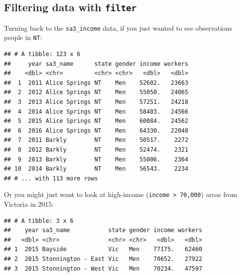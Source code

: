 \documentclass[]{book}
\newenvironment{Shaded}{\begin{snugshade}}{\end{snugshade}}
\newcommand{\DecValTok}[1]{\textcolor[rgb]{0.00,0.00,0.81}{#1}}
\newcommand{\KeywordTok}[1]{\textcolor[rgb]{0.13,0.29,0.53}{\textbf{#1}}}
\newcommand{\NormalTok}[1]{#1}
\newcommand{\OperatorTok}[1]{\textcolor[rgb]{0.81,0.36,0.00}{\textbf{#1}}}
\newcommand{\StringTok}[1]{\textcolor[rgb]{0.31,0.60,0.02}{#1}}
\begin{document}
\hypertarget{filtering-data-with-filter}{%
\subsection{\texorpdfstring{Filtering data with \texttt{filter}}{Filtering data with filter}}\label{filtering-data-with-filter}}

Turning back to the \texttt{sa3\_income} data, if you just wanted to see observations people in \texttt{NT}:

\begin{Shaded}
\end{Shaded}

\begin{verbatim}
## # A tibble: 123 x 6
##     year sa3_name      state gender income workers
##    <dbl> <chr>         <chr> <chr>   <dbl>   <dbl>
##  1  2011 Alice Springs NT    Men    52602.   23663
##  2  2012 Alice Springs NT    Men    55050.   24065
##  3  2013 Alice Springs NT    Men    57251.   24218
##  4  2014 Alice Springs NT    Men    58403.   24566
##  5  2015 Alice Springs NT    Men    60084.   24562
##  6  2016 Alice Springs NT    Men    64330.   22048
##  7  2011 Barkly        NT    Men    50517.    2272
##  8  2012 Barkly        NT    Men    52474.    2321
##  9  2013 Barkly        NT    Men    55006.    2364
## 10  2014 Barkly        NT    Men    56543.    2234
## # ... with 113 more rows
\end{verbatim}

Or you might just want to look at high-income (\texttt{income\ \textgreater{}\ 70,000}) areas from Victoria in 2015:

\begin{Shaded}
\end{Shaded}

\begin{verbatim}
## # A tibble: 3 x 6
##    year sa3_name           state gender income workers
##   <dbl> <chr>              <chr> <chr>   <dbl>   <dbl>
## 1  2015 Bayside            Vic   Men    77175.   62460
## 2  2015 Stonnington - East Vic   Men    70652.   27922
## 3  2015 Stonnington - West Vic   Men    70234.   47597
\end{verbatim}
\end{document}
